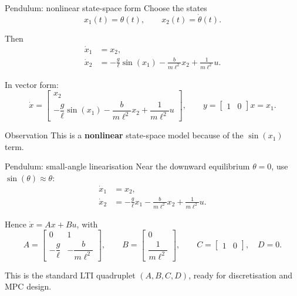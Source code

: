 \documentclass[aspectratio=169,10pt]{beamer}
\begin{document}
\begin{frame}{Pendulum: nonlinear state-space form}
Choose the states
\[
x_1(t)=\theta(t),\qquad x_2(t)=\dot{\theta}(t).
\]

Then
\begin{align*}
\dot{x}_1 &= x_2,\\
\dot{x}_2 &= -\frac{g}{\ell}\sin(x_1)
              -\frac{b}{m\ell^2}x_2
              +\frac{1}{m\ell^2}u.
\end{align*}

In vector form:
\[
\dot{x}=
\begin{bmatrix}
x_2\\[4pt]
-\dfrac{g}{\ell}\sin(x_1)
-\dfrac{b}{m\ell^2}x_2
+\dfrac{1}{m\ell^2}u
\end{bmatrix},
\qquad
y=\begin{bmatrix}1 & 0\end{bmatrix}x = x_1.
\]

\begin{notebox}{Observation}
This is a \textbf{nonlinear} state-space model because of the
$\sin(x_1)$ term.
\end{notebox}
\end{frame}

\begin{frame}{Pendulum: small-angle linearisation}
Near the downward equilibrium $\theta=0$, use
$\sin(\theta)\approx\theta$:
\begin{align*}
\dot{x}_1 &= x_2,\\
\dot{x}_2 &= -\frac{g}{\ell}x_1
              -\frac{b}{m\ell^2}x_2
              +\frac{1}{m\ell^2}u.
\end{align*}

Hence $\dot{x}=Ax+Bu$, with
\[
A=
\begin{bmatrix}
0 & 1\\[4pt]
-\dfrac{g}{\ell} & -\dfrac{b}{m\ell^2}
\end{bmatrix},
\qquad
B=
\begin{bmatrix}
0\\[4pt]
\dfrac{1}{m\ell^2}
\end{bmatrix},
\qquad
C=\begin{bmatrix}1 & 0\end{bmatrix},
\quad
D=0.
\]

This is the standard LTI quadruplet $(A,B,C,D)$, ready for discretisation and MPC design.
\end{frame}
\end{document}
